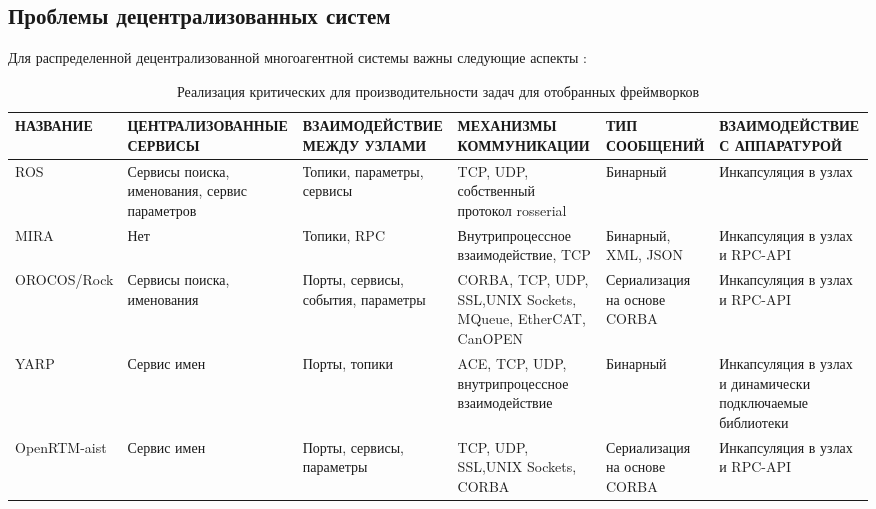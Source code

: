 \subsection{Проблемы децентрализованных систем}
Для распределенной децентрализованной многоагентной системы важны следующие аспекты \cite{blasco2012multiagent}:

\begin{table*}[h!]
	\scriptsize
	\centering	
	\caption{Реализация критических для производительности задач для отобранных фреймворков}
	\label{tab:solutions}
	\def\arraystretch{1.5}
	\begin{tabular}{lp{3.5cm}p{3cm}p{3cm}p{1.9cm}p{2cm}}
		\toprule
		\textbf{НАЗВАНИЕ} & \textbf{ЦЕНТРАЛИЗОВАННЫЕ СЕРВИСЫ} & \textbf{ВЗАИМОДЕЙСТВИЕ МЕЖДУ УЗЛАМИ} & \textbf{МЕХАНИЗМЫ КОММУНИКАЦИИ} & \textbf{ТИП СООБЩЕНИЙ} & \textbf{ВЗАИМОДЕЙСТВИЕ С АППАРАТУРОЙ} \\		
		\midrule     
		ROS         & Сервисы поиска, именования, сервис параметров & Топики, параметры, сервисы         & TCP, UDP, собственный протокол rosserial                     & Бинарный                     & Инкапсуляция в узлах\\ 
		MIRA         & Нет                                           & Топики, RPC                        & Внутрипроцессное взаимодействие, TCP                         & Бинарный, XML, JSON  & Инкапсуляция в узлах и RPC-API     \\ 
		OROCOS/Rock  & Сервисы поиска, именования                    & Порты, сервисы, события, параметры & CORBA, TCP, UDP, SSL,UNIX Sockets, MQueue, EtherCAT, CanOPEN & Сериализация на основе CORBA & Инкапсуляция в узлах и RPC-API \\ 
		YARP         & Сервис имен                                   & Порты, топики                      & ACE, TCP, UDP, внутрипроцессное взаимодействие               & Бинарный                 & Инкапсуляция в узлах и динамически подключаемые библиотеки    \\ 
		OpenRTM-aist & Сервис имен                                   & Порты, сервисы, параметры          & TCP, UDP, SSL,UNIX Sockets, CORBA                            & Сериализация на основе CORBA & Инкапсуляция в узлах и RPC-API\\ 
		\bottomrule
	\end{tabular}
\end{table*}


